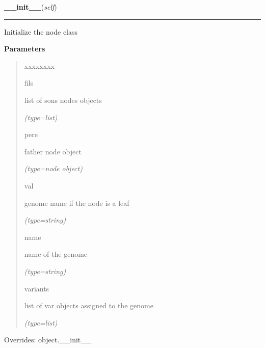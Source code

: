     \vspace{0.5ex}

\hspace{.8\funcindent}\begin{boxedminipage}{\funcwidth}

    \raggedright \textbf{\_\_init\_\_}(\textit{self})

    \vspace{-1.5ex}

    \rule{\textwidth}{0.5\fboxrule}
\setlength{\parskip}{2ex}
    Initialize the node class

\setlength{\parskip}{1ex}
      \textbf{Parameters}
      \vspace{-1ex}

      \begin{quote}
        \begin{Ventry}{xxxxxxxx}

          \item[fils]

          list of sons nodes objects

            {\it (type=list)}

          \item[pere]

          father node object

            {\it (type=node object)}

          \item[val]

          genome name if the node is a leaf

            {\it (type=string)}

          \item[name]

          name of the genome

            {\it (type=string)}

          \item[variants]

          list of var objects assigned to the genome

            {\it (type=list)}

        \end{Ventry}

      \end{quote}

      Overrides: object.\_\_init\_\_

    \end{boxedminipage}

    \label{script-phyloFixedVar:node:nbFils}

